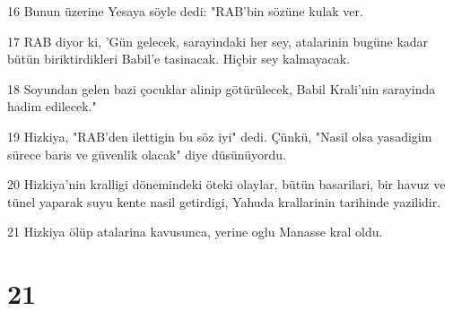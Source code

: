 \par 16 Bunun üzerine Yesaya söyle dedi: "RAB'bin sözüne kulak ver.
\par 17 RAB diyor ki, 'Gün gelecek, sarayindaki her sey, atalarinin bugüne kadar bütün biriktirdikleri Babil'e tasinacak. Hiçbir sey kalmayacak.
\par 18 Soyundan gelen bazi çocuklar alinip götürülecek, Babil Krali'nin sarayinda hadim edilecek."
\par 19 Hizkiya, "RAB'den ilettigin bu söz iyi" dedi. Çünkü, "Nasil olsa yasadigim sürece baris ve güvenlik olacak" diye düsünüyordu.
\par 20 Hizkiya'nin kralligi dönemindeki öteki olaylar, bütün basarilari, bir havuz ve tünel yaparak suyu kente nasil getirdigi, Yahuda krallarinin tarihinde yazilidir.
\par 21 Hizkiya ölüp atalarina kavusunca, yerine oglu Manasse kral oldu.

\chapter{21}

